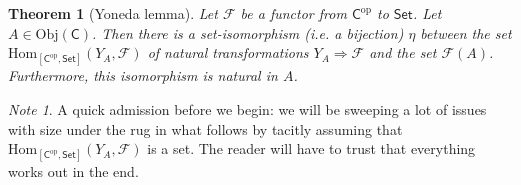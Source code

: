 \documentclass[a4paper]{report}
\newcommand{\Obj}{\mathrm{Obj}}
\newcommand{\Hom}{\mathrm{Hom}}
\theoremstyle{definition}
\theoremstyle{plain}
\newtheorem{theorem}{Theorem}[section]
\theoremstyle{remark}
\newtheorem{note}{Note}[section]
\begin{document}
\begin{theorem}[Yoneda lemma]
  Let $\mathcal{F}$ be a functor from $\mathsf{C}^{\mathrm{op}}$ to $\mathsf{Set}$. Let $A \in \Obj(\mathsf{C})$. Then there is a set-isomorphism (i.e. a bijection) $\eta$ between the set $\Hom_{[\mathsf{C}^{\text{op}}, \mathsf{Set}]}(Y_{A}, \mathcal{F})$ of natural transformations $Y_{A} \Rightarrow \mathcal{F}$ and the set $\mathcal{F}(A)$. Furthermore, this isomorphism is natural in $A$.
\end{theorem}
\begin{note}
  A quick admission before we begin: we will be sweeping a lot of issues with size under the rug in what follows by tacitly assuming that $\Hom_{[\mathsf{C}^{\text{op}}, \mathsf{Set}]}(Y_{A}, \mathcal{F})$ is a set. The reader will have to trust that everything works out in the end.
\end{note}
\end{document}
